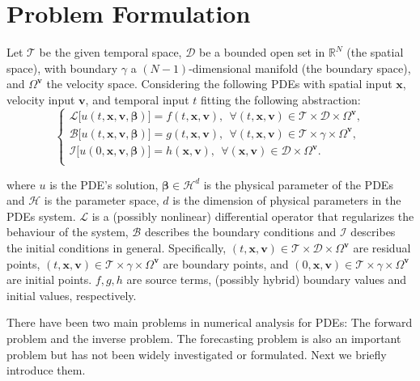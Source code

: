\documentclass[preprint,11pt]{elsarticle}
\newcommand{\bx}{\boldsymbol{x}}
\newcommand{\bv}{\boldsymbol{v}}
\begin{document}
\section{Problem Formulation} 
\label{sec: problem_formualtion}
Let $\mathcal{T}$ be the given temporal space, $\mathcal{D}$ be a bounded open set in $\mathbb{R}^N$ (the spatial space), with boundary $\gamma$ a $(N-1)$-dimensional manifold (the boundary space), and $\Omega^{\bv}$ the velocity space. Considering the following PDEs with spatial input $\bx$, velocity input $\bv$, and temporal input $t$ fitting the following abstraction:
\begin{equation}\label{PDEsys2}
    \begin{cases}
    \mathcal{L} \big[ u(t,\boldsymbol{x},\boldsymbol{v},\boldsymbol{\beta})\big] = f(t,\boldsymbol{x},\boldsymbol{v}),\:\: \forall (t, \boldsymbol{x},\boldsymbol{v}) \in \mathcal{T}\times \mathcal{D}\times\Omega^{\boldsymbol{v}},\\
     \mathcal{B} \big[ u(t,\boldsymbol{x},\boldsymbol{v},\boldsymbol{\beta})\big] = g(t,\boldsymbol{x},\boldsymbol{v}),\:\: \forall (t, \boldsymbol{x}, \boldsymbol{v}) \in \mathcal{T}\times \gamma\times\Omega^{\boldsymbol{v}},\\ \mathcal{I}\big[u(0,\boldsymbol{x},\boldsymbol{v},\boldsymbol{\beta})\big] = h(\boldsymbol{x},\boldsymbol{v}),\:\: \forall (\boldsymbol{x},\boldsymbol{v}) \in \mathcal{D}\times\Omega^{\boldsymbol{v}}.\\
    \end{cases}
\end{equation}

where $u$ is the PDE's solution,   $\boldsymbol{\beta} \in \mathcal{H}^{d}$ is the physical parameter of the PDEs and $\mathcal{H}$ is the parameter space, $d$ is the dimension of physical parameters in the PDEs system. $\mathcal{L}$ is a (possibly nonlinear) differential operator that regularizes the behaviour of the system, $\mathcal{B}$ describes the boundary conditions and $\mathcal{I}$ describes the initial conditions in general. Specifically, $(t,\boldsymbol{x},\boldsymbol{v})\in\mathcal{T}\times\mathcal{D}\times \Omega^{\bv}$ are residual points, $(t, \boldsymbol{x}, \boldsymbol{v}) \in \mathcal{T}\times \gamma\times\Omega^{\boldsymbol{v}}$ are boundary points, and $ (0,\boldsymbol{x},\boldsymbol{v}) \in \mathcal{T}\times\gamma\times\Omega^{\boldsymbol{v}}$ are initial points. $f,g,h$ are source terms, (possibly hybrid) boundary values and initial values, respectively.

There have been two main problems in numerical analysis for PDEs: The forward problem and the inverse problem. The forecasting problem is also an important problem but has not been widely investigated or formulated. Next we briefly introduce them.
\end{document}
